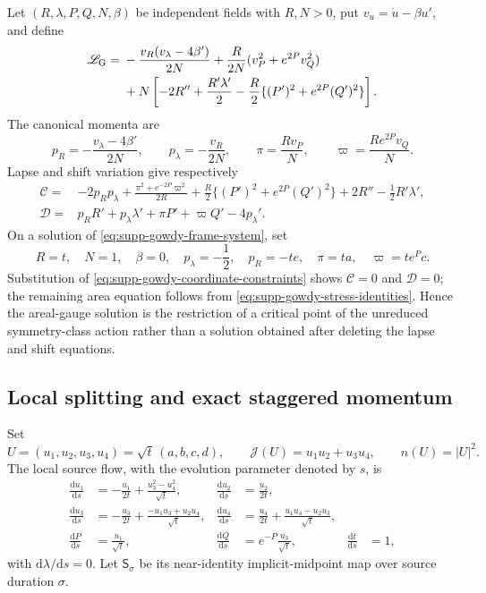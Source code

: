 \documentclass[11pt]{article}
\theoremstyle{definition}
\theoremstyle{remark}
\newcommand{\dd}{\mathrm d}
\begin{document}
Let $(R,\lambda,P,Q,N,\beta)$ be independent fields with $R,N>0$, put
$v_u=\dot u-\beta u'$, and define
\begin{align}
 \mathscr L_{\rm G}={}&
 -\frac{v_R(v_\lambda-4\beta')}{2N}
 +\frac R{2N}(v_P^2+e^{2P}v_Q^2)\nonumber\\
 &+N\left[-2R''+\frac{R'\lambda'}2
 -\frac R2\{(P')^2+e^{2P}(Q')^2\}\right].
 \label{eq:supp-gowdy-adm-density}
\end{align}
The canonical momenta are
\begin{equation}
 p_R=-\frac{v_\lambda-4\beta'}{2N},\qquad
 p_\lambda=-\frac{v_R}{2N},\qquad
 \pi=\frac{Rv_P}{N},\qquad
 \varpi=\frac{Re^{2P}v_Q}{N}.
 \label{eq:supp-gowdy-momenta}
\end{equation}
Lapse and shift variation give respectively
\begin{align}
 \mathcal C={}&-2p_Rp_\lambda
 +\frac{\pi^2+e^{-2P}\varpi^2}{2R}
 +\frac R2\{(P')^2+e^{2P}(Q')^2\}
 +2R''-\frac12R'\lambda',\label{eq:supp-gowdy-H}\\
 \mathcal D={}&p_RR'+p_\lambda\lambda'+\pi P'+\varpi Q'-4p_\lambda'.
 \label{eq:supp-gowdy-D}
\end{align}
On a solution of \eqref{eq:supp-gowdy-frame-system}, set
\begin{equation}
 R=t,\quad N=1,\quad\beta=0,\quad
 p_\lambda=-\frac12,\quad p_R=-te,\quad
 \pi=ta,\quad\varpi=te^Pc.
 \label{eq:supp-gowdy-areal-lift}
\end{equation}
Substitution of \eqref{eq:supp-gowdy-coordinate-constraints} shows
$\mathcal C=0$ and $\mathcal D=0$; the remaining area equation follows from
\eqref{eq:supp-gowdy-stress-identities}.  Hence the areal-gauge solution is the
restriction of a critical point of the unreduced symmetry-class action rather
than a solution obtained after deleting the lapse and shift equations.

\subsection{Local splitting and exact staggered momentum}

Set
\begin{equation}
 U=(u_1,u_2,u_3,u_4)=\sqrt t\,(a,b,c,d),\qquad
 \mathcal J(U)=u_1u_2+u_3u_4,
 \qquad n(U)=|U|^2.
 \label{eq:supp-gowdy-rescaled-frame}
\end{equation}
The local source flow, with the evolution parameter denoted by $s$, is
\begin{align}
 \frac{\dd u_1}{\dd s}&=-\frac{u_1}{2t}
 +\frac{u_3^2-u_4^2}{\sqrt t},&
 \frac{\dd u_2}{\dd s}&=\frac{u_2}{2t},\nonumber\\
 \frac{\dd u_3}{\dd s}&=-\frac{u_3}{2t}
 +\frac{-u_1u_3+u_2u_4}{\sqrt t},&
 \frac{\dd u_4}{\dd s}&=\frac{u_4}{2t}
 +\frac{u_1u_4-u_2u_3}{\sqrt t},\nonumber\\
 \frac{\dd P}{\dd s}&=\frac{u_1}{\sqrt t},&
 \frac{\dd Q}{\dd s}&=e^{-P}\frac{u_3}{\sqrt t},&
 \frac{\dd t}{\dd s}&=1,
 \label{eq:supp-gowdy-source-flow}
\end{align}
with $\dd\lambda/\dd s=0$.  Let $\mathsf S_\sigma$ be its near-identity
implicit-midpoint map over source duration $\sigma$.
\end{document}
